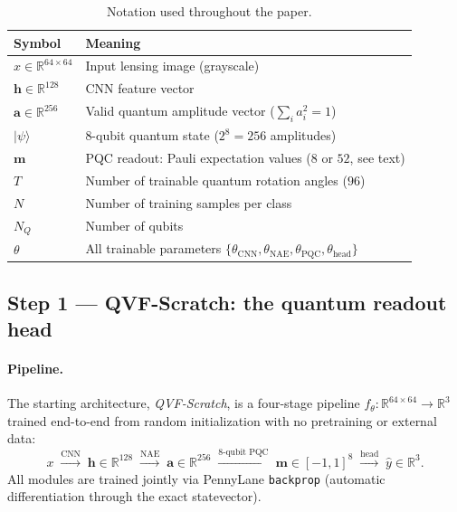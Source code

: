 \documentclass[10pt,letterpaper]{article}
\theoremstyle{plain}
\theoremstyle{definition}
\begin{document}
\begin{table}[h!]
\centering
\caption{Notation used throughout the paper.}
\begin{tabular}{@{}ll@{}}
\toprule
Symbol & Meaning \\
\midrule
$x \in \mathbb{R}^{64 \times 64}$ & Input lensing image (grayscale) \\
$\mathbf{h} \in \mathbb{R}^{128}$ & CNN feature vector \\
$\mathbf{a} \in \mathbb{R}^{256}$ & Valid quantum amplitude vector ($\sum_i a_i^2 = 1$) \\
$|\psi\rangle$ & 8-qubit quantum state ($2^8 = 256$ amplitudes) \\
$\mathbf{m}$ & PQC readout: Pauli expectation values ($8$ or $52$, see text) \\
$T$ & Number of trainable quantum rotation angles ($96$) \\
$N$ & Number of training samples per class \\
$N_Q$ & Number of qubits \\
$\theta$ & All trainable parameters $\{\theta_\mathrm{CNN}, \theta_\mathrm{NAE}, \theta_\mathrm{PQC}, \theta_\mathrm{head}\}$ \\
\bottomrule
\end{tabular}
\label{tab:notation}
\end{table}

\subsection{Step 1 --- QVF-Scratch: the quantum readout head}
\label{sec:scratch}

\paragraph{Pipeline.}
The starting architecture, \emph{QVF-Scratch}, is a four-stage pipeline
$f_\theta : \mathbb{R}^{64\times64} \to \mathbb{R}^3$ trained end-to-end from
random initialization with no pretraining or external data:
\begin{equation}
  x
  \;\xrightarrow{\mathrm{CNN}}\;
  \mathbf{h} \in \mathbb{R}^{128}
  \;\xrightarrow{\mathrm{NAE}}\;
  \mathbf{a} \in \mathbb{R}^{256}
  \;\xrightarrow{\text{8-qubit PQC}}\;
  \mathbf{m} \in [-1,1]^{8}
  \;\xrightarrow{\mathrm{head}}\;
  \hat{y} \in \mathbb{R}^3.
  \label{eq:pipeline}
\end{equation}
All modules are trained jointly via PennyLane \texttt{backprop} (automatic
differentiation through the exact statevector).
\end{document}
